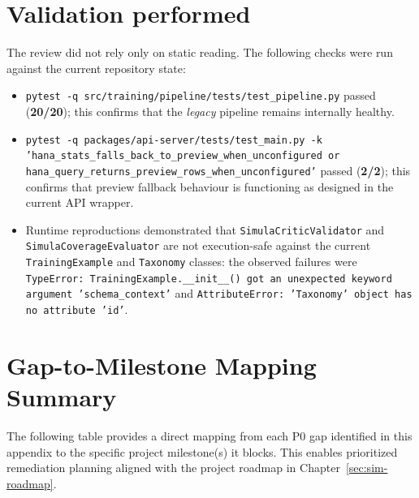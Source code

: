 \section{Validation performed}
The review did not rely only on static reading. The following checks
were run against the current repository state:
\begin{itemize}
  \item \texttt{pytest -q src/training/pipeline/tests/test\_pipeline.py}
    passed (\textbf{20/20}); this confirms that the \emph{legacy}
    pipeline remains internally healthy.
  \item \texttt{pytest -q packages/api-server/tests/test\_main.py -k
    'hana\_stats\_falls\_back\_to\_preview\_when\_unconfigured or
    hana\_query\_returns\_preview\_rows\_when\_unconfigured'} passed
    (\textbf{2/2}); this confirms that preview fallback behaviour is
    functioning as designed in the current API wrapper.
  \item Runtime reproductions demonstrated that
    \texttt{SimulaCriticValidator} and
    \texttt{SimulaCoverageEvaluator} are not execution-safe against
    the current \texttt{TrainingExample} and \texttt{Taxonomy}
    classes: the observed failures were
    \texttt{TypeError: TrainingExample.\_\_init\_\_() got an
    unexpected keyword argument 'schema\_context'} and
    \texttt{AttributeError: 'Taxonomy' object has no attribute 'id'}.
\end{itemize}

\section{Gap-to-Milestone Mapping Summary}

The following table provides a direct mapping from each P0 gap identified in this appendix to the specific project milestone(s) it blocks. This enables prioritized remediation planning aligned with the project roadmap in Chapter~\ref{sec:sim-roadmap}.

